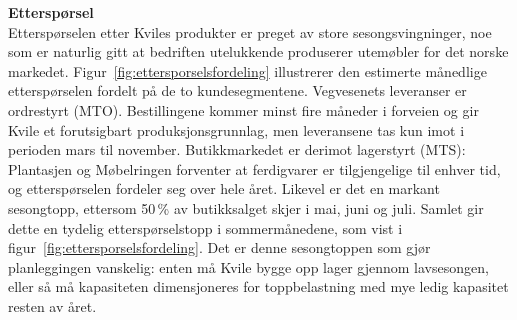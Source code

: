 \textbf{Etterspørsel}\\
Etterspørselen etter Kviles produkter er preget av store sesongsvingninger, noe som er naturlig gitt at bedriften utelukkende produserer utemøbler for det norske markedet. Figur~\ref{fig:ettersporselsfordeling} illustrerer den estimerte månedlige etterspørselen fordelt på de to kundesegmentene. Vegvesenets leveranser er ordrestyrt (MTO). Bestillingene kommer minst fire måneder i forveien og gir Kvile et forutsigbart produksjonsgrunnlag, men leveransene tas kun imot i perioden mars til november. Butikkmarkedet er derimot lagerstyrt (MTS): Plantasjen og Møbelringen forventer at ferdigvarer er tilgjengelige til enhver tid, og etterspørselen fordeler seg over hele året. Likevel er det en markant sesongtopp, ettersom 50\,\% av butikksalget skjer i mai, juni og juli. Samlet gir dette en tydelig etterspørselstopp i sommermånedene, som vist i figur~\ref{fig:ettersporselsfordeling}. Det er denne sesongtoppen som gjør planleggingen vanskelig: enten må Kvile bygge opp lager gjennom lavsesongen, eller så må kapasiteten dimensjoneres for toppbelastning med mye ledig kapasitet resten av året.



